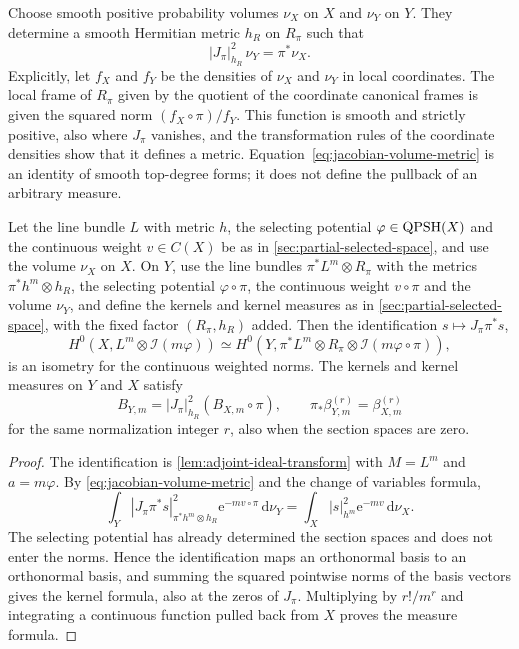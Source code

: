 Choose smooth positive probability volumes $\nu_X$ on $X$ and $\nu_Y$ on $Y$. They determine a smooth Hermitian metric $h_R$ on $R_\pi$ such that
\begin{equation}\label{eq:jacobian-volume-metric}
 |J_\pi|_{h_R}^2\,\nu_Y=\pi^*\nu_X.
\end{equation}
Explicitly, let $f_X$ and $f_Y$ be the densities of $\nu_X$ and $\nu_Y$ in local coordinates. The local frame of $R_\pi$ given by the quotient of the coordinate canonical frames is given the squared norm $(f_X\circ\pi)/f_Y$. This function is smooth and strictly positive, also where $J_\pi$ vanishes, and the transformation rules of the coordinate densities show that it defines a metric. Equation~\eqref{eq:jacobian-volume-metric} is an identity of smooth top-degree forms; it does not define the pullback of an arbitrary measure.

\begin{proposition}\label{prop:birational-partial-kernel-measures}
Let the line bundle $L$ with metric $h$, the selecting potential $\varphi\in\mathrm{QPSH}(X)$ and the continuous weight $v\in C(X)$ be as in \cref{sec:partial-selected-space}, and use the volume $\nu_X$ on $X$. On $Y$, use the line bundles $\pi^*L^m\otimes R_\pi$ with the metrics $\pi^*h^m\otimes h_R$, the selecting potential $\varphi\circ\pi$, the continuous weight $v\circ\pi$ and the volume $\nu_Y$, and define the kernels and kernel measures as in \cref{sec:partial-selected-space}, with the fixed factor $(R_\pi,h_R)$ added. Then the identification $s\mapsto J_\pi\pi^*s$,
\[
 H^0(X,L^m\otimes\mathcal I(m\varphi))
 \simeq H^0(Y,\pi^*L^m\otimes R_\pi
                         \otimes\mathcal I(m\varphi\circ\pi)),
\]
is an isometry for the continuous weighted norms. The kernels and kernel measures on $Y$ and $X$ satisfy
\[
 B_{Y,m}=|J_\pi|_{h_R}^2(B_{X,m}\circ\pi),
 \qquad \pi_*\beta_{Y,m}^{(r)}=\beta_{X,m}^{(r)}
\]
for the same normalization integer $r$, also when the section spaces are zero.
\end{proposition}
\begin{proof}
The identification is \cref{lem:adjoint-ideal-transform} with $M=L^m$ and $a=m\varphi$. By \eqref{eq:jacobian-volume-metric} and the change of variables formula,
\[
 \int_Y|J_\pi\pi^*s|_{\pi^*h^m\otimes h_R}^2\mathrm{e}^{-mv\circ\pi}\,\mathrm{d}\nu_Y
 =\int_X|s|_{h^m}^2\mathrm{e}^{-mv}\,\mathrm{d}\nu_X.
\]
The selecting potential has already determined the section spaces and does not enter the norms. Hence the identification maps an orthonormal basis to an orthonormal basis, and summing the squared pointwise norms of the basis vectors gives the kernel formula, also at the zeros of $J_\pi$. Multiplying by $r!/m^r$ and integrating a continuous function pulled back from $X$ proves the measure formula.
\end{proof}

